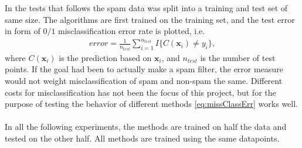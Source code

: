  In the tests that follows the spam data was split into a training and test set of same size. The algorithms are first trained on the training set, and the test error in form of $0/1$ misclassification error rate is plotted, i.e.
 \begin{align}
   \label{eq:missClassErr} 
   error =  \frac{1}{n_{test}} \sum_{i = 1}^{n_{test}} I\{C(\mathbf{x}_i) \neq y_i\},
 \end{align}
 where $C(\mathbf{x}_i)$ is the prediction based on $\mathbf{x}_i$, and $n_{test}$ is the number of test points. If the goal had been to actually make a spam filter, the error measure would not weight misclassification of spam and non-spam the same. Different costs for misclassification has not been the focus of this project, but for the purpose of testing the behavior of different methods \eqref{eq:missClassErr} works well.
\\ 
\\
In all the following experiments, the methods are trained on half the data and tested on the other half. All methods are trained using the same datapoints. 

